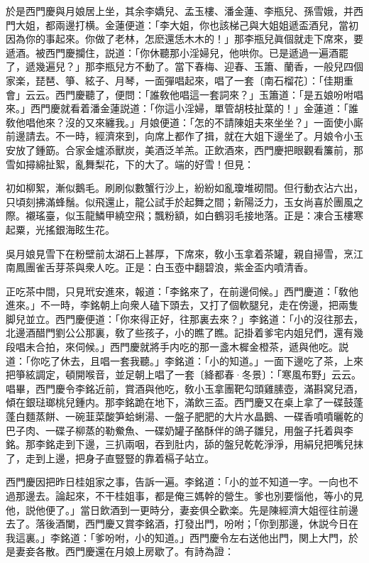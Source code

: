 於是西門慶與月娘居上坐，其余李嬌兒、孟玉樓、潘金蓮、李瓶兒、孫雪娥，并西門大姐，都兩邊打横。金蓮便道：「李大姐，你也該梯己與大姐姐遞盃酒兒，當初因為你的事起來。你做了老林，怎麽還恁木木的！」那李瓶兒眞個就走下席來，要遞酒。被西門慶攔住，説道：「你休聽那小淫婦兒，他哄你。已是遞過一遍酒罷了，遞幾遍兒？」那李瓶兒方不動了。當下春梅、迎春、玉簫、蘭香，一般兒四個家楽，琵琶、箏、絃子、月琴，一面彈唱起來，唱了一套〔南石榴花〕：「佳期重會」云云。西門慶聽了，便問：「誰敎他唱這一套詞來？」玉簫道：「是五娘吩咐唱來。」西門慶就看着潘金蓮説道：「你這小淫婦，單管胡枝扯葉的！」金蓮道：「誰敎他唱他來？沒的又來纏我。」月娘便道：「怎的不請陳姐夫來坐坐？」一面使小廝前邊請去。不一時，經濟來到，向席上都作了揖，就在大姐下邊坐了。月娘令小玉安放了鍾筯。合家金爐添獸炭，美酒泛羊羔。正飲酒來，西門慶把眼觀看簾前，那雪如撏綿扯絮，亂舞梨花，下的大了。端的好雪！但見：

\begin{myquote}
初如柳絮，漸似鵝毛。刷刷似數蟹行沙上，紛紛如亂瓊堆砌間。但行動衣沾六出，只頃刻拂滿蜂鬚。似飛還止，龍公試手於起舞之間；新陽泛力，玉女尚喜於團風之際。襯瑤臺，似玉龍鱗甲繞空飛；飄粉額，如白鶴羽毛接地落。正是：凍合玉樓寒起粟，光搖銀海眩生花。
\end{myquote}

吳月娘見雪下在粉壁前太湖石上甚厚，下席來，敎小玉拿着茶罐，親自掃雪，烹江南鳳團雀舌芽茶與衆人吃。正是：白玉壺中翻碧浪，紫金盃内噴清香。

正吃茶中間，只見玳安進來，報道：「李銘來了，在前邊伺候。」西門慶道：「敎他進來。」不一時，李銘朝上向衆人磕下頭去，又打了個軟腿兒，走在傍邊，把兩隻脚兒並立。西門慶便道：「你來得正好，往那裏去來？」李銘道：「小的沒往那去，北邊酒醋門劉公公那裏，敎了些孩子，小的瞧了瞧。記掛着爹宅内姐兒們，還有幾段唱未合拍，來伺候。」西門慶就將手内吃的那一盞木樨金橙茶，遞與他吃。説道：「你吃了休去，且唱一套我聽。」李銘道：「小的知道。」一面下邊吃了茶，上來把箏絃調定，頓開喉音，並足朝上唱了一套〔絳都春·冬景〕：「寒風布野」云云。　唱畢，西門慶令李銘近前，賞酒與他吃，敎小玉拿團靶勾頭雞膆壺，滿斟窝兒酒，傾在銀琺瑯桃兒鍾内。那李銘跪在地下，滿飲三盃。西門慶又在桌上拿了一碟鼓蓬蓬白麵蒸餅、一碗韮菜酸笋蛤蜊湯、一盤子肥肥的大片水晶鵝、一碟香噴噴曬乾的巴子肉、一碟子柳蒸的勒鮝魚、一碟奶罐子酪酥伴的鴿子雛兒，用盤子托着與李銘。那李銘走到下邊，三扒兩咽，吞到肚内，舔的盤兒乾乾淨淨，用絹兒把嘴兒抹了，走到上邊，把身子直豎豎的靠着槅子站立。

西門慶因把昨日桂姐家之事，告訴一遍。李銘道：「小的並不知道一字。一向也不過那邊去。論起來，不干桂姐事，都是俺三媽幹的營生。爹也別要惱他，等小的見他，説他便了。」當日飲酒到一更時分，妻妾俱仝歡楽。先是陳經濟大姐徑往前邊去了。落後酒闌，西門慶又賞李銘酒，打發出門，吩咐；「你到那邊，休説今日在我這裏。」李銘道：「爹吩咐，小的知道。」西門慶令左右送他出門，関上大門，於是妻妾各散。西門慶還在月娘上房歇了。有詩為證：

